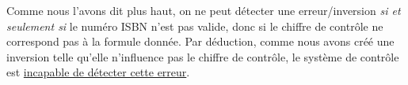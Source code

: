 \documentclass[10p,a4paper]{scrartcl}
\begin{document}
\begin{enumerate}
			Comme nous l'avons dit plus haut, on ne peut détecter une erreur/inversion \textit{si et seulement si} le numéro ISBN n'est pas valide, donc si le chiffre de contrôle ne correspond pas à la formule donnée. Par déduction, comme nous avons créé une inversion telle qu'elle n'influence pas le chiffre de contrôle, le système de contrôle est \underline{incapable de détecter cette erreur}.
\end{enumerate}
\end{document}
